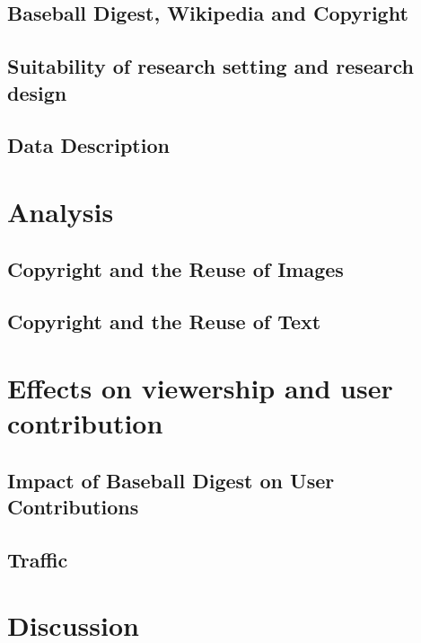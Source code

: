 \documentclass[12pt]{article}
\begin{document}
\subsection{Baseball Digest, Wikipedia and Copyright}

\subsection{Suitability of research setting and research design}

\subsection{Data Description}


\section{Analysis}
\subsection{Copyright and the Reuse of Images}
\subsection{Copyright and the Reuse of Text}


\section{Effects on viewership and user contribution}
\subsection{Impact of Baseball Digest on User Contributions}
\subsection{Traffic}

\section{Discussion}


\newpage

\baselineskip 14.2pt


\end{document}
